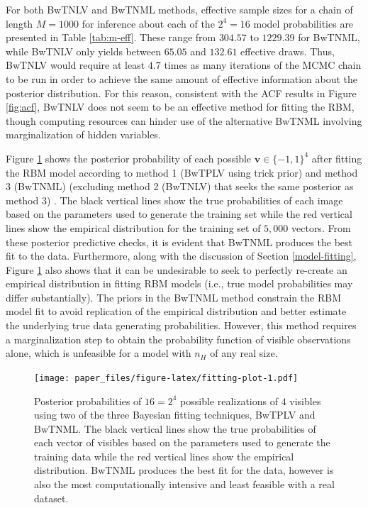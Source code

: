 \documentclass[AMS,STIX1COL]{WileyNJD-v2}
\newcommand{\nh}{{n_{\scriptscriptstyle H}}}
\begin{document}
For both BwTNLV and BwTNML methods, effective sample sizes for a chain
of length \(M = 1000\) for inference about each of the \(2^4 = 16\)
model probabilities are presented in Table \ref{tab:m-eff}. These range
from \(304.57\) to \(1229.39\) for BwTNML, while BwTNLV only yields
between \(65.05\) and \(132.61\) effective draws. Thus, BwTNLV would
require at least \(4.7\) times as many iterations of the MCMC chain to
be run in order to achieve the same amount of effective information
about the posterior distribution. For this reason, consistent with the
ACF results in Figure \ref{fig:acf}, BwTNLV does not seem to be an
effective method for fitting the RBM, though computing resources can
hinder use of the alternative BwTNML involving marginalization of hidden
variables.

Figure \ref{fig:fitting-plot} shows the posterior probability of each
possible \(\boldsymbol v \in \{-1,1\}^4\) after fitting the RBM model
according to method 1 (BwTPLV using trick prior) and method 3 (BwTNML)
(excluding method 2 (BwTNLV) that seeks the same posterior as method 3)
. The black vertical lines show the true probabilities of each image
based on the parameters used to generate the training set while the red
vertical lines show the empirical distribution for the training set of
\(5,000\) vectors. From these posterior predictive checks, it is evident
that BwTNML produces the best fit to the data. Furthermore, along with
the discussion of Section \ref{model-fitting}, Figure
\ref{fig:fitting-plot} also shows that it can be undesirable to seek to
perfectly re-create an empirical distribution in fitting RBM models
(i.e., true model probabilities may differ substantially). The priors in
the BwTNML method constrain the RBM model fit to avoid replication of
the empirical distribution and better estimate the underlying true data
generating probabilities. However, this method requires a
marginalization step to obtain the probability function of visible
observations alone, which is unfeasible for a model with \(\nh\) of any
real size.

\par

\begin{figure}
\centering
\texttt{[image: paper\_files/figure-latex/fitting-plot-1.pdf]}
\caption{\label{fig:fitting-plot}Posterior probabilities of \(16 = 2^4\)
possible realizations of \(4\) visibles using two of the three Bayesian
fitting techniques, BwTPLV and BwTNML. The black vertical lines show the
true probabilities of each vector of visibles based on the parameters
used to generate the training data while the red vertical lines show the
empirical distribution. BwTNML produces the best fit for the data,
however is also the most computationally intensive and least feasible
with a real dataset.}
\end{figure}
\end{document}
